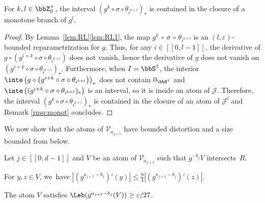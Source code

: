 \begin{lem}
\label{lem:repar-monot}
For $k,l \in \bbZ_0^+$, the interval $(g^k \circ \sigma \circ \theta_{i^{k+l}})_*$ is contained in the closure of a monotone branch of $g^l$.
\end{lem}

\begin{proof}
By Lemma~\ref{lem:RL}\eqref{lem:RL1}, the map $g^k \, \circ \, \sigma \, \circ \, \theta_{i^{k+l}}$ is an $(l, \varepsilon)$-bounded reparametrization for $g$.
Thus, for any $i \in [\![ 0, l-1 ]\!]$, the derivative of $g \circ \left (g^{i+k} \circ \sigma \circ \theta_{i^{k+l}} \right)$ does not vanish, hence the derivative of $g$ does not vanish on $\left (g^{i+k} \circ \sigma \circ \theta_{i^{k+l}} \right)_*$.
Furthermore, when $I = \bbS^1$, the interior $\inte \left (g \circ \left (g^{i+k} \circ \sigma \circ \theta_{i^{k+l}} \right) \right)_*$ does not contain $0_{\bbS^1}$ and $\inte \left ((g^{i+k} \circ \sigma \circ \theta_{i^{k+l}})_* \right)$ is an interval, so it is inside an atom of $\mathcal{J}$.
Therefore, the interval $(g^k \circ \sigma \circ \theta_{i^{k+l}})_*$ is contained in the closure of an atom of $\mathcal{J}^l$ and Remark \ref{rmq:monot} concludes.
\end{proof}

We now show that the atoms of $\mathcal{V}_{a_{j+1}}$ have bounded distortion and a size bounded from below.

\begin{lem}
\label{lem:prop-atomes}
Let $j \!\in\! [\![ 0, d-1 ]\!]$ and $V$ be an atom of $\mathcal{V}_{a_{j+1}}$ such that $g^{-b_j} V$ intersects~$R$.
\begin{enumeratei}
\item
 For $y,z \in V$, we~have $|(g^{a_{j+1} - b_j})'(y)| \leq \frac{9}{4} |(g^{a_{j+1} - b_j})'(z)|$.
\item
 The atom $V$ satisfies
$
\Leb(g^{a_{j+1}-b_j}(V)) \geq \varepsilon / 27
$.
\end{enumeratei}
\end{lem}

